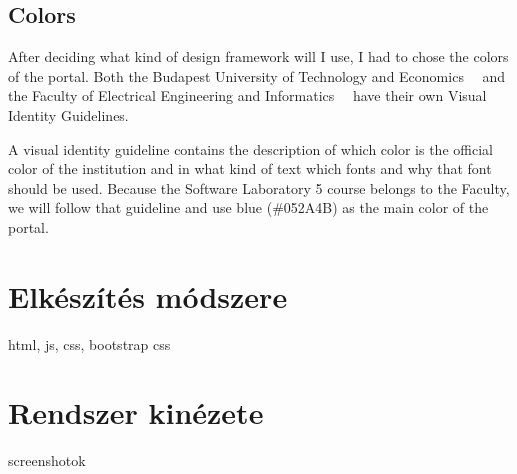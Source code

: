 \subsection{Colors}

After deciding what kind of design framework will I use, I had to chose the colors of the portal. Both the Budapest University of Technology and Economics~\cite{BME-Arculat}~\cite{BME-Arculat-Intranet} and the Faculty of Electrical Engineering and Informatics~\cite{VIK-Arculat}~\cite{VIK-Arculat-PDF} have their own Visual Identity Guidelines. 

A visual identity guideline contains the description of which color is the official color of the institution and in what kind of text which fonts and why that font should be used. Because the Software Laboratory 5 course belongs to the Faculty, we will follow that guideline and use blue (\#052A4B) as the main color of the portal. 

\section{Elkészítés módszere}

html, js, css, bootstrap css


\section{Rendszer kinézete}

screenshotok

